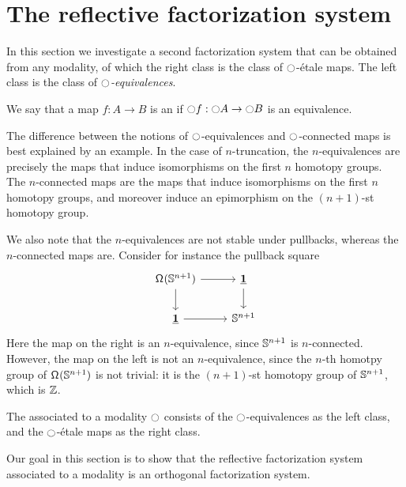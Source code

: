 \documentclass[9pt,twosided]{amsart}
\begin{document}
\section{The reflective factorization system}

In this section we investigate a second factorization system that can be obtained from any modality, of which the right class is the class of ${\ocircle}$-\'etale maps. The left class is the class of \emph{${\ocircle}$-equivalences}.

\begin{defn}
We say that a map $f:A\to B$ is an  if ${\ocircle} f:{\ocircle} A\to {\ensuremath{\ocircle}} B$ is an equivalence.
\end{defn}

\begin{rmk}
The difference between the notions of ${\ocircle}$-equivalences and ${\ocircle}$-connected maps is best explained by an example. In the case of $n$-truncation, the $n$-equivalences are precisely the maps that induce isomorphisms on the first $n$ homotopy groups. The $n$-connected maps are the maps that induce isomorphisms on the first $n$ homotopy groups, and moreover induce an epimorphism on the $(n+1)$-st homotopy group. 

We also note that the $n$-equivalences are not stable under pullbacks, whereas the $n$-connected maps are. Consider for instance the pullback square
\begin{equation*}
\begin{tikzcd}
\loopspace {\sphere{n+1}} \arrow[r] \arrow[d] & \unit \arrow[d] \\
\unit\arrow[r] & \sphere{n+1}
\end{tikzcd}
\end{equation*}
Here the map on the right is an $n$-equivalence, since $\mathbb{S}^{n+1}$ is $n$-connected. However, the map on the left is not an $n$-equivalence, since the $n$-th homotpy group of $\mathsf{\Omega}^{}(\mathbb{S}^{n+1})$ is not trivial: it is the $(n+1)$-st homotopy group of $\mathbb{S}^{n+1}$, which is $\mathbb{Z}$.
\end{rmk}

\begin{defn}
The  associated to a modality ${\ocircle}$ consists of the ${\ocircle}$-equivalences as the left class, and the ${\ocircle}$-\'etale maps as the right class.
\end{defn}

Our goal in this section is to show that the reflective factorization system associated to a modality is an orthogonal factorization system.
\end{document}
